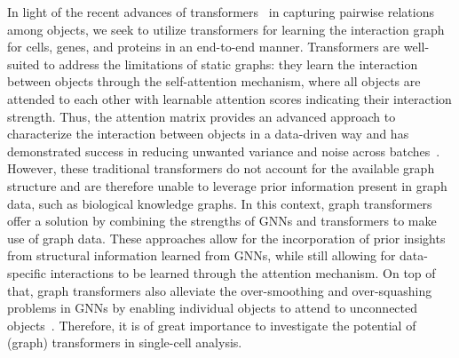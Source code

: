 In light of the recent advances of transformers~\cite{devlin2018bert, kitaev2020reformer, liu2021swin, liu2022swin} in capturing pairwise relations among objects, we seek to utilize transformers for learning the interaction graph for cells, genes, and proteins in an end-to-end manner. Transformers are well-suited to address the limitations of static graphs: they learn the interaction between objects through the self-attention mechanism, where all objects are attended to each other with learnable attention scores indicating their interaction strength. Thus, the attention matrix provides an advanced approach to characterize the interaction between objects in a data-driven way and has demonstrated success in reducing unwanted variance and noise across batches~\cite{yang2022scbert}. 
However, these traditional transformers do not account for the available graph structure and are therefore unable to leverage prior information present in graph data, such as biological knowledge graphs. In this context, graph transformers~\cite{rampasek2022recipe, ying2021transformers, dwivedi2020generalization}  offer a solution by combining the strengths of GNNs and transformers to make use of graph data. These approaches allow for the incorporation of prior insights from structural information learned from GNNs, while still allowing for data-specific interactions to be learned through the attention mechanism.
On top of that, graph transformers also alleviate the over-smoothing and over-squashing problems in GNNs by enabling individual objects to attend to unconnected objects~\cite{chen2022structure, dwivedi2021graph, kreuzer2021rethinking, rampavsek2022recipe}. 
Therefore, it is of great importance to investigate the potential of (graph) transformers in single-cell analysis.


